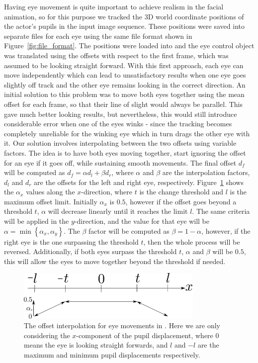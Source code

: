 Having eye movement is quite important to achieve realism in the facial animation, so for this purpose we tracked the 3D world coordinate positions of the actor's pupils in the input image sequence.
These positions were saved into separate files for each eye using the same file format shown in Figure~\ref{fig:file_format}.
The positions were loaded into \Maya and the eye control object was translated using the offsets with respect to the first frame, which was assumed to be looking straight forward.
With this first approach, each eye can move independently which can lead to unsatisfactory results when one eye goes slightly off track and the other eye remains looking in the correct direction. An initial solution to this problem was to move both eyes together using the mean offset for each frame, so that their line of slight would always be parallel. This gave much better looking results, but nevertheless, this would still introduce considerable error when one of the eyes winks - since the tracking becomes completely unreliable for the winking eye which in turn drags the other eye with it.
Our solution involves interpolating between the two offsets using variable factors.
The idea is to have both eyes moving together, start ignoring the offset for an eye if it goes off, while sustaining smooth movements.
The final offset $d_f$ will be computed as $d_f = \alpha d_l + \beta d_r$, where $\alpha$ and $\beta$ are the interpolation factors, $d_l$ and $d_r$ are the offsets for the left and right eye, respectively.
Figure~\ref{fig:eyes_interpolation} shows the $\alpha_x$ values along the $x$-direction, where $t$ is the change threshold and $l$ is the maximum offset limit.
Initially $\alpha_x$ is $0.5$, however if the offset goes beyond a threshold $t$, $\alpha$ will decrease linearly until it reaches the limit $l$.
The same criteria will be applied in the $y$-direction, and the value for that eye will be $\alpha = \min \left\lbrace \alpha_x, \alpha_y \right\rbrace$.
The $\beta$ factor will be computed as $\beta = 1 - \alpha$, however, if the right eye is the one surpassing the threshold $t$, then the whole process will be reversed. 
Additionally, if both eyes surpass the threshold $t$, $\alpha$ and $\beta$ will be $0.5$, this will allow the eyes to move together beyond the threshold if needed.

\begin{figure}[htbp!]
\centering
\includegraphics[width=0.8\textwidth]{img/eyes_interpolation}
	\caption{The offset interpolation for eye movements in \Maya. Here we are only considering the $x$-component of the pupil displacement, where 0 means the eye is looking straight forwards, and $l$ and $-l$ are the maximum and minimum pupil displacements respectively. }
	\label{fig:eyes_interpolation}
\end{figure}

